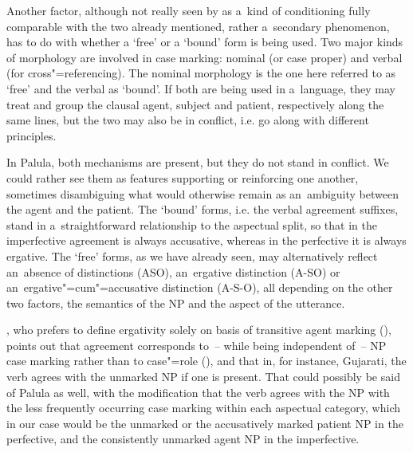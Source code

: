 Another factor, although not really seen by \citet[94]{dixon1994} as a~kind of conditioning fully comparable with the two already mentioned, rather a~secondary phenomenon, has to do with whether a `free' or a `bound' form is being used. Two major kinds of morphology are involved in case marking: nominal (or case proper) and verbal (for cross"=referencing). The nominal morphology is the one here referred to as `free' and the verbal as `bound'. If both are being used in a~language, they may treat and group the clausal agent, subject and patient, respectively along the same lines, but the two may also be in conflict, i.e. go along with different principles. 



In Palula, both mechanisms are present, but they do not stand in conflict. We could rather see them as features supporting or reinforcing one another, sometimes disambiguing what would otherwise remain as an~ambiguity between the agent and the patient. The `bound' forms, i.e. the verbal agreement suffixes, stand in a~straightforward relationship to the aspectual split, so that in the imperfective agreement is always accusative, whereas in the perfective it is always ergative. The `free' forms, as we have already seen, may alternatively reflect an~absence of distinctions (ASO), an~ergative distinction (A-SO) or an~ergative"=cum"=accusative distinction (A-S-O), all depending on the other two factors, the semantics of the NP and the aspect of the utterance. 



\citeauthor{delancey1981}, who prefers to define ergativity solely on basis of transitive agent marking (\citeyear[628]{delancey1981}), points out that agreement corresponds to~-- while being independent of~-- NP case marking rather than to case"=role (\citeyear[631]{delancey1981}), and that in, for instance, Gujarati, the verb agrees with the unmarked NP if one is present. That could possibly be said of Palula as well, with the modification that the verb agrees with the NP with the less frequently occurring case marking within each aspectual category, which in our case would be the unmarked or the accusatively marked patient NP in the perfective, and the consistently unmarked agent NP in the imperfective.

